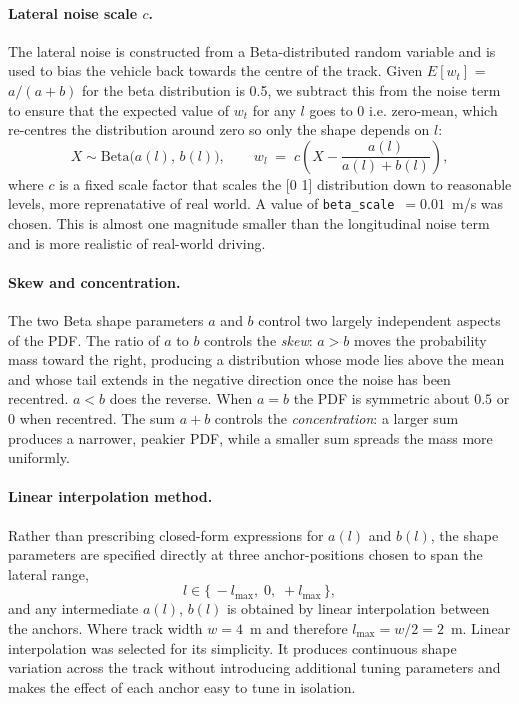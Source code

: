 \documentclass{article}
\begin{document}
\paragraph{Lateral noise scale $c$.}
The lateral noise is constructed from a Beta-distributed random variable and is used to bias the vehicle back towards the centre of the track. Given $E[w_t]$ = $a/(a+b)$ for the beta distribution is 0.5, we subtract this from the noise term to ensure that the expected value of $w_t$ for any $l$ goes to 0 i.e. zero-mean, which re-centres the distribution around zero so only the shape depends on $l$:
\begin{equation}
    X \sim \mathrm{Beta}\bigl(a(l),\,b(l)\bigr), \qquad
    w_l \;=\; c \left( X - \frac{a(l)}{a(l)+b(l)} \right),
    \label{eq:beta_noise}
\end{equation}
where $c$ is a fixed scale factor that scales the [0 1] distribution down to reasonable levels, more reprenatative of real world. A value of \texttt{beta\_scale}~$=0.01$~m/s was chosen. This is almost one magnitude smaller than the longitudinal noise term and is more realistic of real-world driving.

\paragraph{Skew and concentration.}
The two Beta shape parameters $a$ and $b$ control two largely independent aspects of the PDF. The ratio of $a$ to $b$ controls the \emph{skew}: $a>b$ moves the probability mass toward the right, producing a distribution whose mode lies above the mean and whose tail extends in the negative direction once the noise has been recentred. $a<b$ does the reverse. When $a=b$ the PDF is symmetric about $0.5$ or $0$ when recentred. The sum $a+b$ controls the \emph{concentration}: a larger sum produces a narrower, peakier PDF, while a smaller sum spreads the mass more uniformly.

\paragraph{Linear interpolation method.}
Rather than prescribing closed-form expressions for $a(l)$ and $b(l)$, the shape parameters are specified directly at three anchor-positions chosen to span the lateral range,
\begin{equation}
    l \in \{\, -l_{\max},\; 0,\; +l_{\max} \,\},
\end{equation}
and any intermediate $a(l)$, $b(l)$ is obtained by linear interpolation between the anchors. Where track width $w=4$~m and therefore $l_{\max}=w/2=2$~m. Linear interpolation was selected for its simplicity. It produces continuous shape variation across the track without introducing additional tuning parameters and makes the effect of each anchor easy to tune in isolation.
\end{document}
